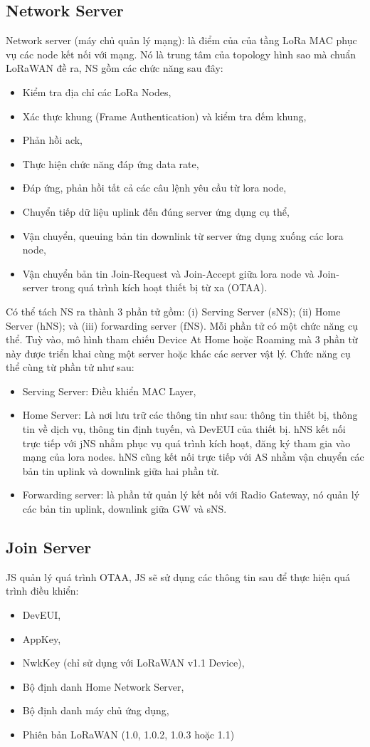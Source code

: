 \subsection{Network Server}
Network server (máy chủ quản lý mạng): là điểm của của tầng LoRa MAC phục vụ các node kết nối với mạng. Nó là trung tâm của topology hình sao mà chuẩn LoRaWAN đề ra, NS gồm các chức năng sau đây:
\begin{itemize}
\item	Kiểm tra địa chỉ các LoRa Nodes,
\item	Xác thực khung (Frame Authentication) và kiểm tra đếm khung,
\item	Phản hồi ack,
\item	Thực hiện chức năng đáp ứng data rate,
\item	Đáp ứng, phản hồi tất cả các câu lệnh yêu cầu từ lora node,
\item	Chuyển tiếp dữ liệu uplink đến đúng server ứng dụng cụ thể,
\item	Vận chuyển, queuing bản tin downlink từ server ứng dụng xuống các lora node,
\item	Vận chuyển bản tin Join-Request và Join-Accept giữa lora node và Join-server trong quá trình kích hoạt thiết bị từ xa (OTAA).
\end{itemize}
Có thể tách NS ra thành 3 phần tử gồm: (i) Serving Server (sNS); (ii) Home Server (hNS); và (iii) forwarding server (fNS). Mỗi phần tử có một chức năng cụ thể. Tuỳ vào, mô hình tham chiếu Device At Home hoặc Roaming mà 3 phần từ này được triển khai cùng một server hoặc khác các server vật lý. Chức năng cụ thể cùng từ phần tử như sau:
\begin{itemize}
\item	Serving Server: Điều khiển MAC Layer,
\item	Home Server: Là nơi lưu trữ các thông tin như sau: thông tin thiết bị, thông tin về dịch vụ, thông tin định tuyến, và DevEUI của thiết bị. hNS kết nối trực tiếp với jNS nhằm phục vụ quá trình kích hoạt, đăng ký tham gia vào mạng của lora nodes. hNS cũng kết nối trực tiếp với AS nhằm vận chuyển các bản tin uplink và downlink giữa hai phần từ. 
\item	Forwarding server: là phần tử quản lý kết nối với Radio Gateway, nó quản lý các bản tin uplink, downlink giữa GW và sNS.
\end{itemize}

\subsection{Join Server}
JS quản lý quá trình OTAA, JS sẽ sử dụng các thông tin sau để thực hiện quá trình điều khiển:
\begin{itemize}
\item	DevEUI,
\item	AppKey,
\item	NwkKey (chỉ sử dụng với LoRaWAN v1.1 Device),
\item	Bộ định danh Home Network Server,
\item	Bộ định danh máy chủ ứng dụng,
\item	Phiên bản LoRaWAN (1.0, 1.0.2, 1.0.3 hoặc 1.1) 
\end{itemize}
